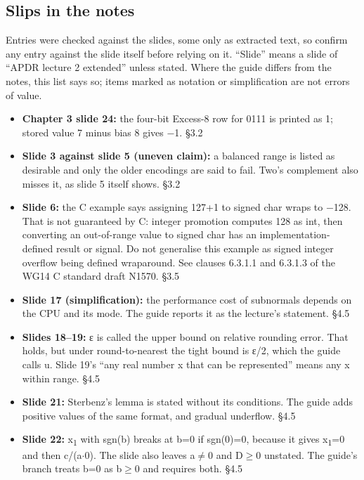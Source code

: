 \documentclass[11pt]{article}
\begin{document}
\begin{keepsection}
\section{Slips in the notes}

Entries were checked against the slides, some only as extracted text, so confirm any entry against the slide itself before relying on it. “Slide” means a slide of “APDR lecture 2 extended” unless stated. Where the guide differs from the notes, this list says so; items marked as notation or simplification are not errors of value.

\begin{itemize}
\item \textbf{Chapter 3 slide 24:} the four-bit Excess-8 row for 0111 is printed as 1; stored value 7 minus bias 8 gives \ensuremath{-}1. \hfill{\small\color{FAUblue}§3.2}
\item \textbf{Slide 3 against slide 5 (uneven claim):} a balanced range is listed as desirable and only the older encodings are said to fail. Two’s complement also misses it, as slide 5 itself shows. \hfill{\small\color{FAUblue}§3.2}
\item \textbf{Slide 6:} the C example says assigning 127+1 to signed char wraps to \ensuremath{-}128. That is not guaranteed by C: integer promotion computes 128 as int, then converting an out-of-range value to signed char has an implementation-defined result or signal. Do not generalise this example as signed integer overflow being defined wraparound. See clauses 6.3.1.1 and 6.3.1.3 of the WG14 C standard draft N1570. \hfill{\small\color{FAUblue}§3.5}
\item \textbf{Slide 17 (simplification):} the performance cost of subnormals depends on the CPU and its mode. The guide reports it as the lecture’s statement. \hfill{\small\color{FAUblue}§4.5}
\item \textbf{Slides 18–19:} ε is called the upper bound on relative rounding error. That holds, but under round-to-nearest the tight bound is ε/2, which the guide calls u. Slide 19’s “any real number x that can be represented” means any x within range. \hfill{\small\color{FAUblue}§4.5}
\item \textbf{Slide 21:} Sterbenz’s lemma is stated without its conditions. The guide adds positive values of the same format, and gradual underflow. \hfill{\small\color{FAUblue}§4.5}
\item \textbf{Slide 22:} x\textsubscript{1} with sgn(b) breaks at b=0 if sgn(0)=0, because it gives x\textsubscript{1}=0 and then c/(a\ensuremath{\cdot}0). The slide also leaves a\ensuremath{\neq}0 and D\ensuremath{\geq}0 unstated. The guide’s branch treats b=0 as b\ensuremath{\geq}0 and requires both. \hfill{\small\color{FAUblue}§4.5}

\end{itemize}
\end{keepsection}
\end{document}
